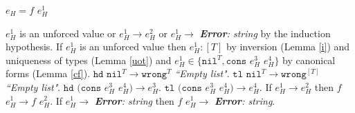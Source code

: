 \begin{case}

$e_{H}=f$ $e_{H}^{1}$

$e_{H}^{1}$ is an unforced value or $e_{H}^{1}\rightarrow e_{H}^{2}$ or $e_{H}^{1}\rightarrow$ \emph{\textbf{Error}: string} by the induction hypothesis.  If $e_{H}^{1}$ is an unforced value then $e_{H}^{1}:[T]$ by inversion (Lemma \ref{i}) and uniqueness of types (Lemma \ref{uot}) and $e_{H}^{1}\in\lbrace\mathtt{nil}^{T},\mathtt{cons}$ $e_{H}^{3}$ $e_{H}^{4}\rbrace$ by canonical forms (Lemma \ref{cf}).  $\mathtt{hd}$ $\mathtt{nil}^{T}\rightarrow\mathtt{wrong}^{T}$ \emph{``Empty list"}.  $\mathtt{tl}$ $\mathtt{nil}^{T}\rightarrow\mathtt{wrong}^{[T]}$ \emph{``Empty list"}.  $\mathtt{hd}$ $(\mathtt{cons}$ $e_{H}^{3}$ $e_{H}^{4})\rightarrow e_{H}^{3}$.  $\mathtt{tl}$ $(\mathtt{cons}$ $e_{H}^{3}$ $e_{H}^{4})\rightarrow e_{H}^{4}$.  If $e_{H}^{1}\rightarrow e_{H}^{2}$ then $f$ $e_{H}^{1}\rightarrow f$ $e_{H}^{2}$.  If $e_{H}^{1}\rightarrow$ \emph{\textbf{Error}: string} then $f$ $e_{H}^{1}\rightarrow$ \emph{\textbf{Error}: string}.

\end{case}